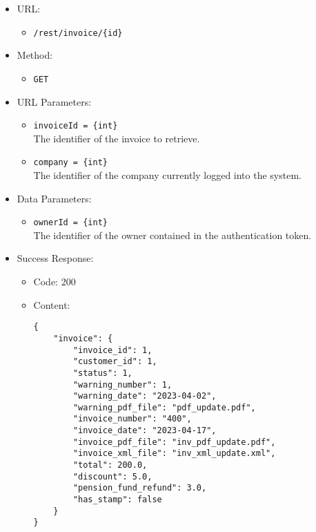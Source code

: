 \begin{itemize}
    
    \item URL: 
    \begin{itemize}
        \item \texttt{/rest/invoice/\{id\}}
    \end{itemize}
    
    \item Method: 
    \begin{itemize}
        \item \texttt{GET}
    \end{itemize}
    
    \item URL Parameters: 
    \begin{itemize}
        \item \texttt{invoiceId = \{int\}} \\
        The identifier of the invoice to retrieve.
        \item \texttt{company = \{int\}} \\
        The identifier of the company currently logged into the system.   
    \end{itemize}
    
    \item Data Parameters: 
    \begin{itemize}
        \item \texttt{ownerId = \{int\}} \\
        The identifier of the owner contained in the authentication token.
    \end{itemize}
    
    \item Success Response: 
    \begin{itemize}
        \item Code: 200
        \item Content:
        \begin{lstlisting}
{
    "invoice": {
        "invoice_id": 1,
        "customer_id": 1,
        "status": 1,
        "warning_number": 1,
        "warning_date": "2023-04-02",
        "warning_pdf_file": "pdf_update.pdf",
        "invoice_number": "400",
        "invoice_date": "2023-04-17",
        "invoice_pdf_file": "inv_pdf_update.pdf",
        "invoice_xml_file": "inv_xml_update.xml",
        "total": 200.0,
        "discount": 5.0,
        "pension_fund_refund": 3.0,
        "has_stamp": false
    }
}

        \end{lstlisting}        
    \end{itemize}
    

\end{itemize}
